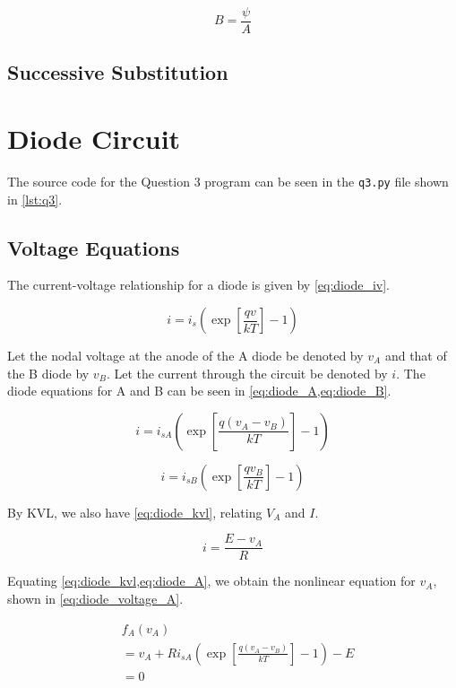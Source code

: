 \documentclass[a4paper,titlepage]{article}
\begin{document}
	\begin{equation} \label{eq:b_psi}
		B = \frac{\psi}{A}
	\end{equation}
	
	\subsection{Successive Substitution}
	
	
	\section{Diode Circuit}
	The source code for the Question 3 program can be seen in the \texttt{q3.py} file shown in \cref{lst:q3}.
	
	\subsection{Voltage Equations}
	The current-voltage relationship for a diode is given by \cref{eq:diode_iv}.
	
	\begin{equation} \label{eq:diode_iv}
		i = i_s \left( \exp\left[{\frac{qv}{kT}}\right] - 1\right)
	\end{equation}
	
	Let the nodal voltage at the anode of the A diode be denoted by $v_A$ and that of the B diode by $v_B$. Let the current through the circuit be denoted by $i$. The diode equations for A and B can be seen in \cref{eq:diode_A,eq:diode_B}.
	
	\begin{equation} \label{eq:diode_A}
		i = i_{sA} \left( \exp\left[{\frac{q(v_A - v_B)}{kT}}\right] - 1\right)
	\end{equation}
	
	\begin{equation} \label{eq:diode_B}
		i = i_{sB} \left( \exp\left[{\frac{qv_B}{kT}}\right] - 1\right)
	\end{equation}
	
	By KVL, we also have \cref{eq:diode_kvl}, relating $V_A$ and $I$.
	
	\begin{equation} \label{eq:diode_kvl}
		i = \frac{E - v_A}{R}
	\end{equation}
	
	Equating \cref{eq:diode_kvl,eq:diode_A}, we obtain the nonlinear equation for $v_A$, shown in \cref{eq:diode_voltage_A}.
	
	\begin{equation} \label{eq:diode_voltage_A}
	\begin{split}
		&f_A(v_A) \\
		& = v_A + R i_{sA} \left( \exp\left[{\frac{q(v_A - v_B)}{kT}}\right] - 1\right) - E \\
		& = 0
	\end{split}
	\end{equation}
	
\end{document}
